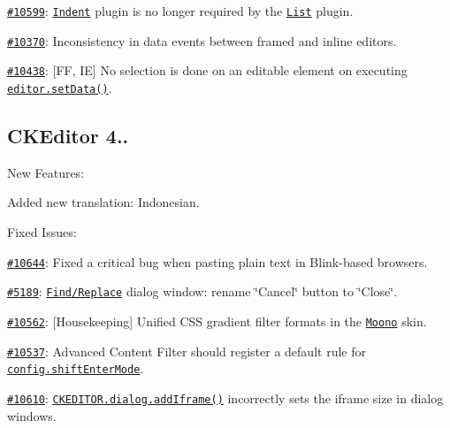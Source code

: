 {\ttfamily 
\begin{DoxyItemize}
\item \href{http://dev.ckeditor.com/ticket/10599}{\tt \#10599}\+: \href{http://ckeditor.com/addon/indent}{\tt Indent} plugin is no longer required by the \href{http://ckeditor.com/addon/list}{\tt List} plugin.
\item \href{http://dev.ckeditor.com/ticket/10370}{\tt \#10370}\+: Inconsistency in data events between framed and inline editors.
\item \href{http://dev.ckeditor.com/ticket/10438}{\tt \#10438}\+: \mbox{[}FF, IE\mbox{]} No selection is done on an editable element on executing \href{http://docs.ckeditor.com/#!/api/CKEDITOR.editor-method-setData}{\tt {\ttfamily editor.\+set\+Data()}}.
\end{DoxyItemize}}

{\ttfamily \subsection*{C\+K\+Editor 4..}}

{\ttfamily }

{\ttfamily New Features\+:}

{\ttfamily 
\begin{DoxyItemize}
\item Added new translation\+: Indonesian.
\end{DoxyItemize}}

{\ttfamily Fixed Issues\+:}

{\ttfamily 
\begin{DoxyItemize}
\item \href{http://dev.ckeditor.com/ticket/10644}{\tt \#10644}\+: Fixed a critical bug when pasting plain text in Blink-\/based browsers.
\item \href{http://dev.ckeditor.com/ticket/5189}{\tt \#5189}\+: \href{http://ckeditor.com/addon/find}{\tt Find/\+Replace} dialog window\+: rename \char`\"{}\+Cancel\char`\"{} button to \char`\"{}\+Close\char`\"{}.
\item \href{http://dev.ckeditor.com/ticket/10562}{\tt \#10562}\+: \mbox{[}Housekeeping\mbox{]} Unified C\+SS gradient filter formats in the \href{http://ckeditor.com/addon/moono}{\tt Moono} skin.
\item \href{http://dev.ckeditor.com/ticket/10537}{\tt \#10537}\+: Advanced Content Filter should register a default rule for \href{http://docs.ckeditor.com/#!/api/CKEDITOR.config-cfg-shiftEnterMode}{\tt {\ttfamily config.\+shift\+Enter\+Mode}}.
\item \href{http://dev.ckeditor.com/ticket/10610}{\tt \#10610}\+: \href{http://docs.ckeditor.com/#!/api/CKEDITOR.dialog-static-method-addIframe}{\tt {\ttfamily C\+K\+E\+D\+I\+T\+O\+R.\+dialog.\+add\+Iframe()}} incorrectly sets the iframe size in dialog windows.
\end{DoxyItemize}}

